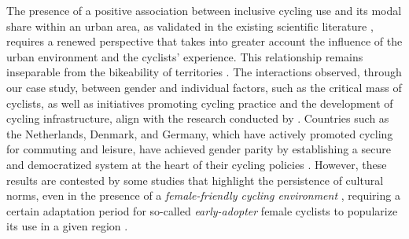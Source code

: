 \begin{refsegment}
The presence of a positive association between inclusive cycling use and its modal share within an urban area, as validated in the existing scientific literature \textcolor{blue}{\autocites[70]{goel_cycling_2022}[63]{garrard_revolutions_2006}}, requires a renewed perspective that takes into greater account the influence of the urban environment and the cyclists' experience. This relationship remains inseparable from the bikeability of territories \textcolor{blue}{\autocite{garrard_women_2021}}. The interactions observed, through our case study, between gender and individual factors, such as the critical mass of cyclists, as well as initiatives promoting cycling practice and the development of cycling infrastructure, align with the research conducted by \textcolor{blue}{\textcite[513]{garrard_women_2012}}. Countries such as the Netherlands, Denmark, and Germany, which have actively promoted cycling for commuting and leisure, have achieved gender parity by establishing a secure and democratized system at the heart of their cycling policies \textcolor{blue}{\autocite[79]{nelson_if_1997}}. However, these results are contested by some studies that highlight the persistence of cultural norms, even in the presence of a \textsl{female-friendly cycling environment} \textcolor{blue}{\autocites[8]{aldred_why_2014}[40]{aldred_does_2016}}, requiring a certain adaptation period for so-called \textsl{early-adopter} female cyclists to popularize its use in a given region \textcolor{blue}{\autocites[8]{aldred_why_2014}[40]{aldred_does_2016}}.%


\end{refsegment}
